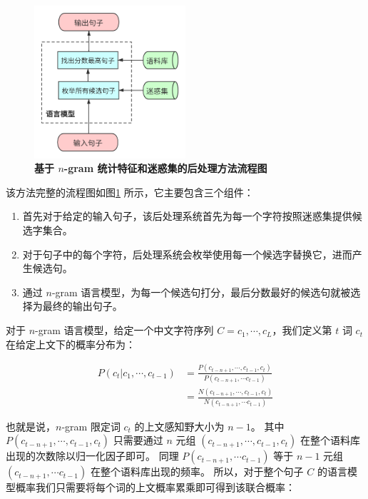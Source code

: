 \begin{figure}[h!]
	\centering
	\includegraphics[width=0.5\textwidth]{figure/resources/CSC.png}
	\caption{\textbf{基于 $n$-gram 统计特征和迷惑集的后处理方法流程图}\label{CSC}}
\end{figure}

该方法完整的流程图如图\ref{CSC} 所示，它主要包含三个组件：

\begin{enumerate}[(1)]
	\item 首先对于给定的输入句子，该后处理系统首先为每一个字符按照迷惑集提供候选字集合。
	\item 对于句子中的每个字符，后处理系统会枚举使用每一个候选字替换它，进而产生候选句。
	\item 通过 $n$-gram 语言模型，为每一个候选句打分，最后分数最好的候选句就被选择为最终的输出句子。
\end{enumerate}

对于 $n$-gram 语言模型，给定一个中文字符序列 $C = c_1, \cdots, c_L$，我们定义第 $t$ 词 $c_t$ 在给定上文下的概率分布为：

\begin{align}
	\label{ngram}
	P(c_t | c_1, \cdots, c_{t-1}) &= \frac{P(c_{t-n+1}, \cdots, c_{t-1}, c_t)}{P(c_{t-n+1}, \cdots c_{t-1})} \nonumber \\
	&= \frac{N(c_{t-n+1}, \cdots, c_{t-1}, c_t)}{N(c_{t-n+1}, \cdots c_{t-1})}
\end{align}

也就是说，$n$-gram 限定词 $c_t$ 的上文感知野大小为 $n-1$。
其中 $P(c_{t-n+1}, \cdots, c_{t-1}, c_t)$ 只需要通过 $n$ 元组 $(c_{t-n+1}, \cdots, c_{t-1}, c_t)$ 在整个语料库出现的次数除以归一化因子即可。
同理 $P(c_{t-n+1}, \cdots c_{t-1})$ 等于 $n-1$ 元组 $(c_{t-n+1}, \cdots c_{t-1})$ 在整个语料库出现的频率。
所以，对于整个句子 $C$ 的语言模型概率我们只需要将每个词的上文概率累乘即可得到该联合概率：

